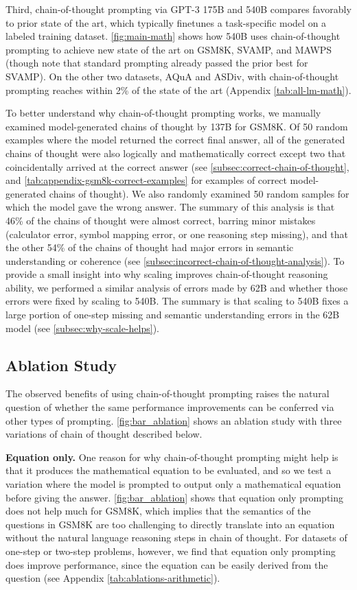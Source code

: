 Third, chain-of-thought prompting via GPT-3 175B and \palm{} 540B compares favorably to prior state of the art, which typically finetunes a task-specific model on a labeled training dataset. 
\cref{fig:main-math} shows how \palm{} 540B uses chain-of-thought prompting to achieve new state of the art on GSM8K, SVAMP, and MAWPS (though note that standard prompting already passed the prior best for SVAMP).
On the other two datasets, AQuA and ASDiv, \palm{} with chain-of-thought prompting reaches within 2\% of the state of the art (Appendix \cref{tab:all-lm-math}).

To better understand why chain-of-thought prompting works,
we manually examined model-generated chains of thought by \lamda{} 137B for GSM8K.
Of 50 random examples where the model returned the correct final answer, all of the generated chains of thought were also logically and mathematically correct except two that coincidentally arrived at the correct answer (see \cref{subsec:correct-chain-of-thought}, and \cref{tab:appendix-gsm8k-correct-examples} for examples of correct model-generated chains of thought).
We also randomly examined 50 random samples for which the model gave the wrong answer.
The summary of this analysis is that 46\% of the chains of thought were almost correct, barring minor mistakes (calculator error, symbol mapping error, or one reasoning step missing), and that the other 54\% of the chains of thought had major errors in semantic understanding or coherence (see \cref{subsec:incorrect-chain-of-thought-analysis}). 
To provide a small insight into why scaling improves chain-of-thought reasoning ability, we performed a similar analysis of errors made by \palm{} 62B and whether those errors were fixed by scaling to \palm{} 540B.
The summary is that scaling \palm{} to 540B fixes a large portion of one-step missing and semantic understanding errors in the 62B model (see \cref{subsec:why-scale-helps}).


\subsection{Ablation Study}\label{subsec:math-ablation}

The observed benefits of using chain-of-thought prompting raises the natural question of whether the same performance improvements can be conferred via other types of prompting.
\cref{fig:bar_ablation} shows an ablation study with three variations of chain of thought described below.

\textbf{Equation only.} One reason for why chain-of-thought prompting might help is that it produces the mathematical equation to be evaluated, and so we test a variation where the model is prompted to output only a mathematical equation before giving the answer. 
\cref{fig:bar_ablation} shows that equation only prompting does not help much for GSM8K, which implies that the semantics of the questions in GSM8K are too challenging to directly translate into an equation without the natural language reasoning steps in chain of thought.
For datasets of one-step or two-step problems, however, we find that equation only prompting does improve performance, since the equation can be easily derived from the question (see Appendix \cref{tab:ablations-arithmetic}). 

